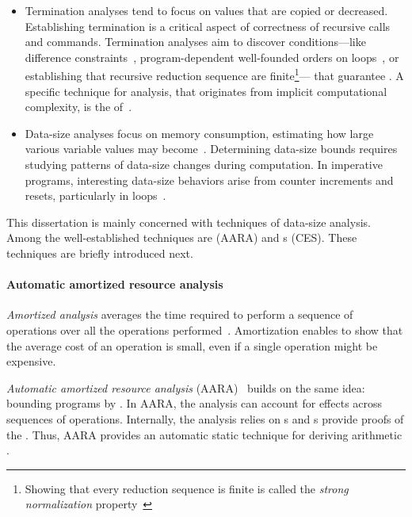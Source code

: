 \begin{itemize}
\item Termination analyses tend to focus on values that are
    copied or decreased. Establishing termination is a critical aspect of
    correctness of recursive calls and commands. Termination analyses aim to
    discover conditions---like difference constraints~\cite{sinn2017},
    program-dependent well-founded orders on loops~\cite{lee2001}, or
    establishing that recursive reduction sequence are finite\footnote{ Showing
    that every reduction sequence is finite is called the \emph{strong
    normalization} property~\cite[p. 36]{bertot2004}}--- that guarantee
    . A specific technique for  analysis, that
    originates from implicit computational complexity, is the  of~\textcite{lee2001}.
\item Data-size analyses focus on memory consumption, estimating how large
    various variable values may become~\cite{lommen2023}. Determining data-size
    bounds requires studying patterns of data-size changes during computation.
    In imperative programs, interesting data-size behaviors arise from counter
    increments and resets, particularly in loops~\cite{sinn2017,benamram2020}.
\end{itemize}

This dissertation is mainly concerned with techniques of data-size analysis.
Among the well-established techniques are  (AARA) and s (CES). These techniques are
briefly introduced next.

\paragraph*{Automatic amortized resource analysis}  \emph{Amortized analysis} averages
the time required to perform a sequence of operations over all the operations
performed~\cite[p. 451]{cormen2009}. Amortization enables to
show that the average cost of an operation is small, even if a single operation
might be expensive.

\emph{Automatic amortized resource analysis}
(AARA)~\cite{hoffmann2022} builds
on the same idea: bounding programs by . In AARA, the analysis
can account for  effects across sequences of operations.
Internally, the analysis relies on s and s provide proofs of the . Thus, AARA provides an
automatic static technique for deriving arithmetic .

